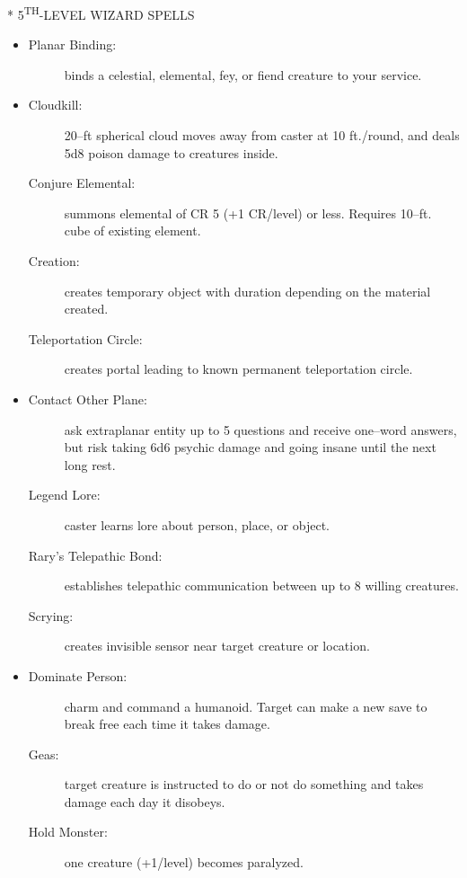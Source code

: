 \documentclass[DIV=14, paper=a4, fontsize=10pt, twocolumn, twoside]{scrartcl}
\makeatletter
\let\origsection\section
\renewcommand\section{\@ifstar{\starsection}{\nostarsection}}
\newcommand\nostarsection[1]
{\origsection{#1}\vspace{-0.5em}}
\newcommand\starsection[1]
{\vspace{-0.5cm}\origsection*{#1}\vspace{-0.3cm}}
\newcommand\invisiblesection[1]{%
  \refstepcounter{section}%
  \sectionmark{#1}
}
\newcommand\listsection[2]{%
	\invisiblesection{#2}
	\section*{\color{dndblue} #1}
}
\renewcommand\thesection{}
\makeatother
\begin{document}
\listsection{\color{dndblue}5\textsuperscript{TH}-LEVEL WIZARD SPELLS}{LEVEL 5}

\begin{itemize}[align=parleft,labelwidth=1cm]
	\renewcommand{\labelitemi}{Abjur}\item
	\begin{description}
 \item[Planar Binding:] binds a celestial, elemental, fey, or fiend creature to your service.
\end{description}
\renewcommand{\labelitemi}{Conj}\item
\begin{description}
 \item[Cloudkill:] 20–ft spherical cloud moves away from caster at 10 ft./round, and deals 5d8 poison damage to creatures inside.
 \item[Conjure Elemental:] summons elemental of CR 5 (+1 CR/level) or less. Requires 10–ft. cube of existing element.
 \item[Creation:] creates temporary object with duration depending on the material created.
 \item[Teleportation Circle:] creates portal leading to known permanent teleportation circle.
\end{description}
\renewcommand{\labelitemi}{Div}\item
\begin{description}
 \item[Contact Other Plane:] ask extraplanar entity up to 5 questions and receive one–word answers, but risk taking 6d6 psychic damage and going insane until the next long rest.
 \item[Legend Lore:] caster learns lore about person, place, or object.
 \item[Rary’s Telepathic Bond:] establishes telepathic communication between up to 8 willing creatures.
 \item[Scrying:] creates invisible sensor near target creature or location.
\end{description}
\renewcommand{\labelitemi}{Ench}\item
\begin{description}
 \item[Dominate Person:] charm and command a humanoid. Target can make a new save to break free each time it takes damage.
 \item[Geas:] target creature is instructed to do or not do something and takes damage each day it disobeys.
 \item[Hold Monster:] one creature (+1/level) becomes paralyzed.

\end{description}
\end{itemize}
\end{document}
